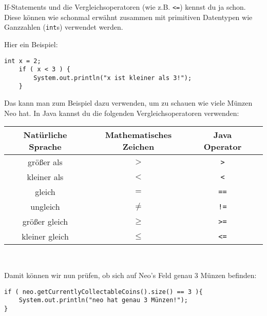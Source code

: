 \addexcercise

\begin{Infobox}[If-Statements 2]

	If-Statements und die Vergleichsoperatoren (wie z.B. \lstinline{<=}) kennst du ja schon.
	Diese können wie schonmal erwähnt zusammen mit primitiven Datentypen wie Ganzzahlen (\lstinline{int}s) verwendet werden.\newline

	Hier ein Beispiel:

	\begin{lstlisting}[numbers=none]
	int x = 2;
	if ( x < 3 ) {
		System.out.println("x ist kleiner als 3!");
	}
	\end{lstlisting}

	Das kann man zum Beispiel dazu verwenden, um zu schauen wie viele Münzen Neo hat.
	In Java kannst du die folgenden Vergleichsoperatoren verwenden:

	\begin{center}
		\begin{tabular}{ c | c | c | l }
			Natürliche Sprache & Mathematisches Zeichen & Java Operator \\
			\hline
			größer als & $>$ & \texttt{>} \\
			kleiner als & $<$ & \texttt{<} \\
			gleich & $=$ & \texttt{==}\\
			ungleich & $\neq$ & \texttt{!=} \\
			größer gleich & $\geq$ & \texttt{>=} \\
			kleiner gleich & $\leq$ & \texttt{<=} \\
        \end{tabular} \\
	\end{center}

	Damit können wir nun prüfen, ob sich auf Neo's Feld genau 3 Münzen befinden:

	\begin{lstlisting}[numbers=none]
if ( neo.getCurrentlyCollectableCoins().size() == 3 ){
	System.out.println("neo hat genau 3 Münzen!");
}
	\end{lstlisting}
\end{Infobox}

